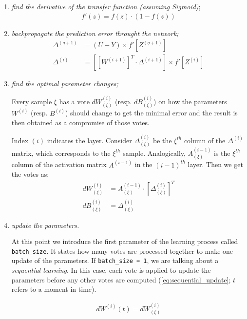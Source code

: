 \begin{enumerate}
\item \textit{find the derivative of the transfer function (assuming Sigmoid)};
\begin{align} \label{eq:transfer_function_der}
f'(z) = f(z) \cdot (1-f(z))
\end{align}
\item \textit{backpropagate the prediction error throught the network;}
\begin{align} \label{eq:error_backprop}
\Delta^{(q+1)} &= (U-Y) \times f'[Z^{(q+1)}] \\
\Delta^{(i)} &= \left[\left[W^{(i+1)}\right]^T \cdot \Delta^{(i+1)}\right] \times f'[Z^{(i)}]
\end{align}
\item \textit{find the optimal parameter changes;}

Every sample $ \xi $ has a vote $ dW^{(i)}_{(\xi)} $ (resp. $ dB^{(i)}_{(\xi)} $) on how the parameters $ W^{(i)} $ (resp. $ B^{(i)} $) should change to get the minimal error and the result is then obtained as a compromise of those votes.

Index $ (i) $ indicates the layer. Consider $ \Delta^{(i)}_{(\xi)} $ be the $ \xi^{th} $ column of the $ \Delta^{(i)} $ matrix, which corresponds to the $ \xi^{th} $ sample. Analogically, $ A^{(i-1)}_{(\xi)} $ is the $ \xi^{th} $ column of the activation matrix $ A^{(i-1)} $ in the $ (i-1)^{th} $ layer. Then we get the votes as:
\begin{align} \label{eq:part_derivative}
dW^{(i)}_{(\xi)} &= A^{(i-1)}_{(\xi)} \cdot \left[\Delta^{(i)}_{(\xi)}\right]^T\\
dB^{(i)}_{(\xi)} &= \Delta^{(i)}_{(\xi)}
\end{align}
\item \textit{update the parameters.}

At this point we introduce the first parameter of the learning process called \texttt{batch\_size}. It states how many votes are processed together to make one update of the parameters. If \texttt{batch\_size = 1}, we are talking about a \textit{sequential learning}. In this case, each vote is applied to update the parameters before any other votes are computed (\cref{eq:sequential_update}; $ t $ refers to a moment in time). 

\begin{align} \label{eq:sequential_update}
dW^{(i)}(t) = dW^{(i)}_{(\xi)}
\end{align}


\end{enumerate}
